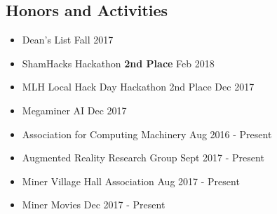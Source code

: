\documentclass[10pt,oneside]{article}
\begin{document}
\subsection*{Honors and Activities}
\begin{itemize}
	\item[] Dean's List
		\hfill Fall 2017
		\vspace*{-7pt}
	\item[] ShamHacks Hackathon \textemdash{} \textbf{2nd Place}
		\hfill Feb 2018
		\vspace*{-7pt}
	\item[] MLH Local Hack Day Hackathon \textemdash{} 2nd Place
		\hfill Dec 2017
		\vspace*{-7pt}
	\item[] Megaminer AI
		\hfill Dec 2017
		\vspace*{-7pt}
	\item[] Association for Computing Machinery
		\hfill Aug 2016 - Present
		\vspace*{-7pt}
	\item[] Augmented Reality Research Group
		\hfill Sept 2017 - Present
		\vspace*{-7pt}
	\item[] Miner Village Hall Association
		\hfill Aug 2017 - Present
		\vspace*{-7pt}
	\item[] Miner Movies
		\hfill Dec 2017 - Present \hspace{1cm}
\end{itemize}
\end{document}
